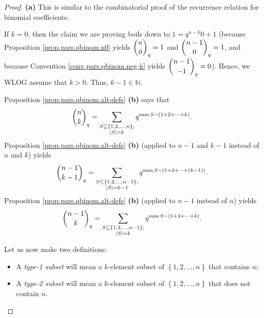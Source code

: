 \begin{proof}
\textbf{(a)} This is similar to the combinatorial proof of the recurrence
relation for binomial coefficients.

If $k=0$, then the claim we are proving boils down to $1=q^{n-k}0+1$ (because
Proposition \ref{prop.pars.qbinom.n0} yields $\dbinom{n}{0}_{q}=1$ and
$\dbinom{n-1}{0}_{q}=1$, and because Convention \ref{conv.pars.qbinom.neg-k}
yields $\dbinom{n-1}{-1}_{q}=0$). Hence, we WLOG assume that $k>0$. Thus,
$k-1\in\mathbb{N}$.

Proposition \ref{prop.pars.qbinom.alt-defs} \textbf{(b)} says that%
\begin{equation}
\dbinom{n}{k}_{q}=\sum_{\substack{S\subseteq\left\{  1,2,\ldots,n\right\}
;\\\left\vert S\right\vert =k}}q^{\operatorname*{sum}S-\left(  1+2+\cdots
+k\right)  }. \label{pf.thm.pars.qbinom.rec.nk}%
\end{equation}
Proposition \ref{prop.pars.qbinom.alt-defs} \textbf{(b)} (applied to $n-1$ and
$k-1$ instead of $n$ and $k$) yields%
\begin{equation}
\dbinom{n-1}{k-1}_{q}=\sum_{\substack{S\subseteq\left\{  1,2,\ldots
,n-1\right\}  ;\\\left\vert S\right\vert =k-1}}q^{\operatorname*{sum}S-\left(
1+2+\cdots+\left(  k-1\right)  \right)  }.
\label{pf.thm.pars.qbinom.rec.n-1k-1}%
\end{equation}
Proposition \ref{prop.pars.qbinom.alt-defs} \textbf{(b)} (applied to $n-1$
instead of $n$) yields%
\begin{equation}
\dbinom{n-1}{k}_{q}=\sum_{\substack{S\subseteq\left\{  1,2,\ldots,n-1\right\}
;\\\left\vert S\right\vert =k}}q^{\operatorname*{sum}S-\left(  1+2+\cdots
+k\right)  }. \label{pf.thm.pars.qbinom.rec.n-1k}%
\end{equation}


Let us now make two definitions:

\begin{itemize}
\item A \emph{type-1 subset} will mean a $k$-element subset of $\left\{
1,2,\ldots,n\right\}  $ that contains $n$;

\item A \emph{type-2 subset} will mean a $k$-element subset of $\left\{
1,2,\ldots,n\right\}  $ that does not contain $n$.
\end{itemize}


\end{proof}
